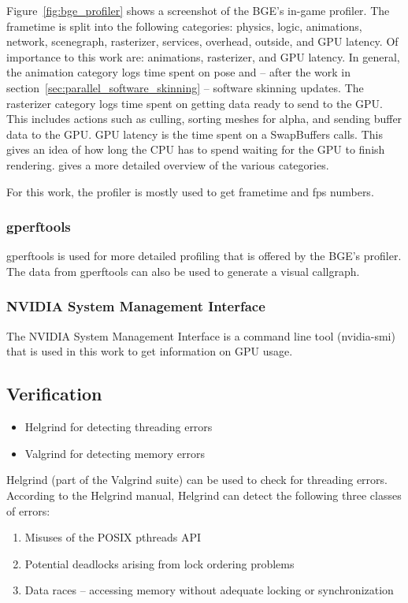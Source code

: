 Figure~\ref{fig:bge_profiler} shows a screenshot of the BGE's in-game profiler.
The frametime is split into the following categories: physics, logic, animations, network, scenegraph, rasterizer, services, overhead, outside, and GPU latency.
Of importance to this work are: animations, rasterizer, and GPU latency.
In general, the animation category logs time spent on pose and -- after the work in section~\ref{sec:parallel_software_skinning} -- software skinning updates.
The rasterizer category logs time spent on getting data ready to send to the GPU.
This includes actions such as culling, sorting meshes for alpha, and sending buffer data to the GPU.
GPU latency is the time spent on a SwapBuffers calls.
This gives an idea of how long the CPU has to spend waiting for the GPU to finish rendering.
\cite{bge_profile_stats} gives a more detailed overview of the various categories.

For this work, the profiler is mostly used to get frametime and fps numbers.

\subsubsection{gperftools}
gperftools\cite{gperftools} is used for more detailed profiling that is offered by the BGE's profiler.
The data from gperftools can also be used to generate a visual callgraph.

\subsubsection{NVIDIA System Management Interface}
The NVIDIA System Management Interface is a command line tool (nvidia-smi) that is used in this work to get information on GPU usage.

\subsection{Verification}
\ifsummaries
\begin{itemize}
 \item Helgrind for detecting threading errors
 \item Valgrind for detecting memory errors
\end{itemize}
\fi

Helgrind (part of the Valgrind suite\cite{valgrind}) can be used to check for threading errors.
According to the Helgrind manual\cite{hgmanual}, Helgrind can detect the following three classes of errors:
\begin{enumerate}
 \item Misuses of the POSIX pthreads API
 \item Potential deadlocks arising from lock ordering problems
 \item Data races -- accessing memory without adequate locking or synchronization
\end{enumerate}

